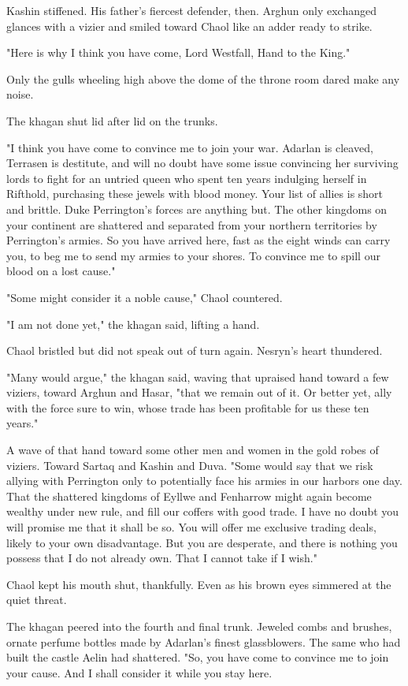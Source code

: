 Kashin stiffened. His father's fiercest defender, then. Arghun only exchanged glances with a vizier and smiled toward Chaol like an adder ready to strike.

"Here is why I think you have come, Lord Westfall, Hand to the King."

Only the gulls wheeling high above the dome of the throne room dared make any noise.

The khagan shut lid after lid on the trunks.

"I think you have come to convince me to join your war. Adarlan is cleaved, Terrasen is destitute, and will no doubt have some issue convincing her surviving lords to fight for an untried queen who spent ten years indulging herself in Rifthold, purchasing these jewels with blood money. Your list of allies is short and brittle. Duke Perrington's forces are anything but. The other kingdoms on your continent are shattered and separated from your northern territories by Perrington's armies. So you have arrived here, fast as the eight winds can carry you, to beg me to send my armies to your shores. To convince me to spill our blood on a lost cause."

"Some might consider it a noble cause," Chaol countered.

"I am not done yet," the khagan said, lifting a hand.

Chaol bristled but did not speak out of turn again. Nesryn's heart thundered.

"Many would argue," the khagan said, waving that upraised hand toward a few viziers, toward Arghun and Hasar, "that we remain out of it. Or better yet, ally with the force sure to win, whose trade has been profitable for us these ten years."

A wave of that hand toward some other men and women in the gold robes of viziers. Toward Sartaq and Kashin and Duva. "Some would say that we risk allying with Perrington only to potentially face his armies in our harbors one day. That the shattered kingdoms of Eyllwe and Fenharrow might again become wealthy under new rule, and fill our coffers with good trade. I have no doubt you will promise me that it shall be so. You will offer me exclusive trading deals, likely to your own disadvantage. But you are desperate, and there is nothing you possess that I do not already own. That I cannot take if I wish."

Chaol kept his mouth shut, thankfully. Even as his brown eyes simmered at the quiet threat.

The khagan peered into the fourth and final trunk. Jeweled combs and brushes, ornate perfume bottles made by Adarlan's finest glassblowers. The same who had built the castle Aelin had shattered. "So, you have come to convince me to join your cause. And I shall consider it while you stay here.

